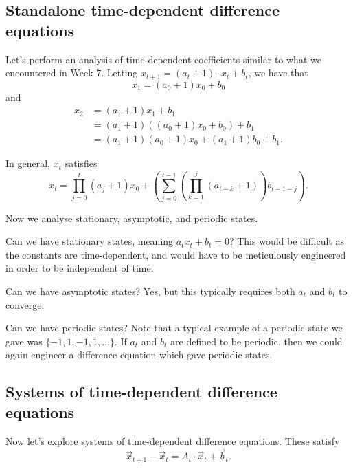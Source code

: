 \documentclass[a4paper, 12pt,oneside,openany]{book}
\begin{document}
\subsection{Standalone time-dependent difference equations}


Let's perform an analysis of time-dependent coefficients similar to what we encountered in Week 7. Letting $x_{t+1} = (a_t+1) \cdot x_t+b_t$, we have that $$x_1 = (a_0+1)x_0+b_0$$ and \begin{align*}x_2 &= (a_1+1)x_1+b_1 \\ &= (a_1+1)((a_0+1)x_0+b_0)+b_1 \\ &= (a_1+1)(a_0+1)x_0+(a_1+1)b_0 + b_1. \end{align*}

In general, $x_t$ satisfies $$x_t = \prod\limits_{j=0}^t (a_j+1)x_0 + \left(\sum\limits_{j=0}^{t-1} \left(\prod\limits_{k=1}^j (a_{t-k}+1)\right) b_{t-1-j}\right).$$

Now we analyse stationary, asymptotic, and periodic states.

Can we have stationary states, meaning $a_tx_t+b_t=0$? This would be difficult as the constants are time-dependent, and would have to be meticulously engineered in order to be independent of time.  

Can we have asymptotic states? Yes, but this typically requires both $a_t$ and $b_t$ to converge. 

Can we have periodic states? Note that a typical example of a periodic state we gave was $\{-1, 1, -1, 1, \dots\}$. If $a_t$ and $b_t$ are defined to be periodic, then we could again engineer a difference equation which gave periodic states.

\subsection{Systems of time-dependent difference equations}

Now let's explore systems of time-dependent difference equations. These satisfy $$\vec{x}_{t+1}-\vec{x}_t = A_t \cdot \vec{x}_t + \vec{b}_t.$$
\end{document}
